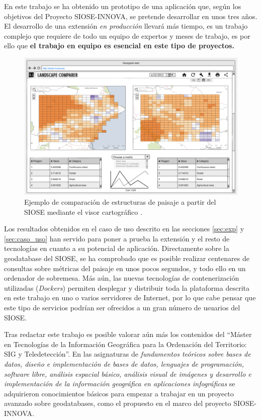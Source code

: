 En este trabajo se ha obtenido un prototipo de una aplicación que, según los objetivos del Proyecto SIOSE-INNOVA, se pretende desarrollar en unos tres años. El desarrollo de una extensión \textit{en producción} llevará más tiempo, es un trabajo complejo que requiere de todo un equipo de expertos y meses de trabajo, es por ello que \textbf{el trabajo en equipo es esencial en este tipo de proyectos.}

\begin{figure}
\begin{center}
\includegraphics[width=\textwidth]{ConclusionyFuturo/Figs/visor-final.png}
\caption{Ejemplo de comparación de estructuras de paisaje a partir del SIOSE mediante el visor cartográfico . \label{fig:visor-final}}
\end{center}
\end{figure}

Los resultados obtenidos en el caso de uso descrito en las secciones \ref{sec:exp} y \ref{sec:caso_uso} han servido para poner a prueba la extensión y el resto de tecnologías en cuanto a su potencial de aplicación. Directamente sobre la geodatabase del SIOSE, se ha comprobado que es posible realizar centenares de consultas sobre métricas del paisaje en unos pocos segundos, y todo ello en un ordenador de sobremesa. Más aún, las nuevas tecnologías de contenerización utilizadas (\textit{Dockers}) permiten desplegar y distribuir toda la plataforma descrita en este trabajo en uno o varios servidores de Internet, por lo que cabe pensar que este tipo de servicios podrían ser ofrecidos a un gran número de usuarios del SIOSE.

Tras redactar este trabajo es posible valorar aún más los contenidos del ``Máster en Tecnologías de la Información Geográfica para la Ordenación del Territorio: SIG y Teledetección''. En las asignaturas de \textit{fundamentos teóricos sobre bases de datos, diseño e implementación de bases de datos, lenguajes de programación, software libre, análisis espacial básico, análisis visual de imágenes y desarrollo e implementación de la información geográfica en aplicaciones infográficas} se adquirieron conocimientos básicos para empezar a trabajar en un proyecto avanzado sobre geodatabases, como el propuesto en el marco del proyecto SIOSE-INNOVA.
